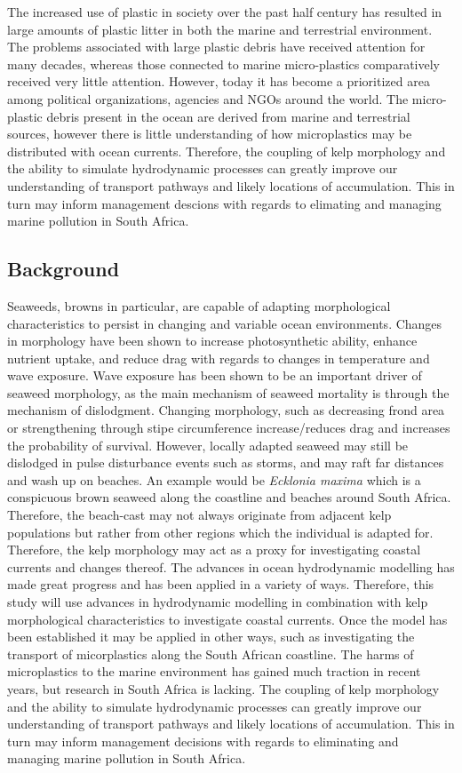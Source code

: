 \documentclass[]{article}
\begin{document}
The increased use of plastic in society over the past half century has
resulted in large amounts of plastic litter in both the marine and
terrestrial environment. The problems associated with large plastic
debris have received attention for many decades, whereas those connected
to marine micro-plastics comparatively received very little attention.
However, today it has become a prioritized area among political
organizations, agencies and NGOs around the world. The micro-plastic
debris present in the ocean are derived from marine and terrestrial
sources, however there is little understanding of how microplastics may
be distributed with ocean currents. Therefore, the coupling of kelp
morphology and the ability to simulate hydrodynamic processes can
greatly improve our understanding of transport pathways and likely
locations of accumulation. This in turn may inform management descions
with regards to elimating and managing marine pollution in South Africa.

\subsection{Background}\label{background}

Seaweeds, browns in particular, are capable of adapting morphological
characteristics to persist in changing and variable ocean environments.
Changes in morphology have been shown to increase photosynthetic
ability, enhance nutrient uptake, and reduce drag with regards to
changes in temperature and wave exposure. Wave exposure has been shown
to be an important driver of seaweed morphology, as the main mechanism
of seaweed mortality is through the mechanism of dislodgment. Changing
morphology, such as decreasing frond area or strengthening through stipe
circumference increase/reduces drag and increases the probability of
survival. However, locally adapted seaweed may still be dislodged in
pulse disturbance events such as storms, and may raft far distances and
wash up on beaches. An example would be \emph{Ecklonia maxima} which is
a conspicuous brown seaweed along the coastline and beaches around South
Africa. Therefore, the beach-cast may not always originate from adjacent
kelp populations but rather from other regions which the individual is
adapted for. Therefore, the kelp morphology may act as a proxy for
investigating coastal currents and changes thereof. The advances in
ocean hydrodynamic modelling has made great progress and has been
applied in a variety of ways. Therefore, this study will use advances in
hydrodynamic modelling in combination with kelp morphological
characteristics to investigate coastal currents. Once the model has been
established it may be applied in other ways, such as investigating the
transport of micorplastics along the South African coastline. The harms
of microplastics to the marine environment has gained much traction in
recent years, but research in South Africa is lacking. The coupling of
kelp morphology and the ability to simulate hydrodynamic processes can
greatly improve our understanding of transport pathways and likely
locations of accumulation. This in turn may inform management decisions
with regards to eliminating and managing marine pollution in South
Africa.
\end{document}
